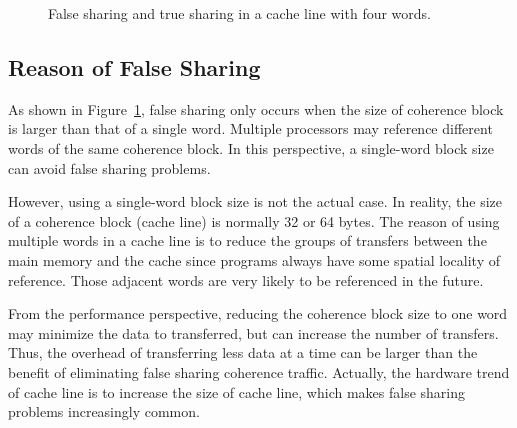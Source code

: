 \begin{figure}
\begin{center} 
%
\hspace{50pt}
%
\end{center}
\caption{False sharing and true sharing in a cache line with four words. }
\label{fig:fsexample}
\end{figure}


\subsection{Reason of False Sharing}

As shown in Figure~\ref{fig:fsexample}, false sharing only occurs when the size of coherence block is larger than that of a single word. Multiple processors may reference different words of the same coherence block. In this perspective, a single-word block size can avoid false sharing problems. 

However, using a single-word block size is not the actual case. In reality, the size of a coherence block (cache line) is normally 32 or 64 bytes. The reason of using multiple words in a cache line is to reduce the groups of transfers between the main memory and the cache since programs always have some spatial locality of reference. Those adjacent words are very likely to be referenced in the future.

From the performance perspective, reducing the coherence block size to one word may minimize the data to transferred, but can increase the number of transfers. Thus, the overhead of transferring less data at a time can be larger than the benefit of eliminating false sharing coherence traffic. Actually, the hardware trend of cache line is to increase the size of cache line, which makes false sharing problems increasingly common. 

